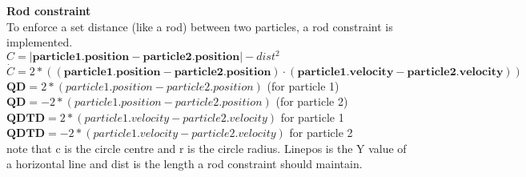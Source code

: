 \smallskip
\textbf{Rod constraint} \\
To enforce a set distance (like a rod) between two particles, a rod constraint is implemented. \\
$C = |\boldsymbol{particle1.position} - \boldsymbol{particle2.position}| - dist^2$ \\
$\dot{C} = 2*((\boldsymbol{particle1.position} - \boldsymbol{particle2.position}) \cdot (\boldsymbol{particle1.velocity} - \boldsymbol{particle2.velocity})	) $ \\
$\boldsymbol{QD} = 2*(particle1.position - particle2.position)$ (for particle 1) \\
$\boldsymbol{QD} = -2*(particle1.position - particle2.position)$ (for particle 2) \\
$\boldsymbol{QDTD}= 2*(particle1.velocity - particle2.velocity)$ for particle 1\\
$\boldsymbol{QDTD}= -2*(particle1.velocity - particle2.velocity)$ for particle 2\\

\smallskip
note that c is the circle centre and r is the circle radius. Linepos is the Y value of a horizontal line and dist is the length a rod constraint should maintain.

